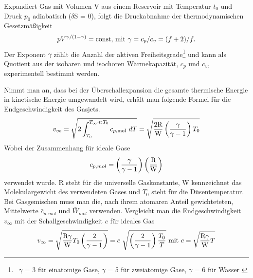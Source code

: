 %
Expandiert Gas mit Volumen V aus einem Reservoir mit Temperatur $t_0$ und Druck $p_0$ adiabatisch ($\delta$S = 0), folgt die Druckabnahme der thermodynamischen Gesetzmäßigkeit
\begin{equation}
pV^{\gamma/(1-\gamma)} = \textmd{const, mit}\ \gamma=c_p/c_v=(f+2)/f .
\end{equation}
%
Der Exponent $\gamma$ zählt die Anzahl der aktiven Freiheitsgrade\footnote[3]{\ $\gamma$ = 3 für einatomige Gase, $\gamma$ = 5 für zweiatomige Gase, $\gamma$ = 6 für Wasser \cite{mul13}} und kann als Quotient aus der isobaren und isochoren Wärmekapazität, $c_p$ und $c_v$, experimentell bestimmt werden. 

Nimmt man an, dass bei der Überschallexpansion die gesamte thermische Energie in kinetische Energie umgewandelt wird, erhält man folgende Formel für die Endgeschwindigkeit des Gasjets.
\begin{equation}
v_\infty=\sqrt{2\int_{T_0}^{T_\infty \ll T_0} c_{p,{\tiny \textmd{mol}}}\ dT}= \sqrt{\frac{2\textmd{R}}{\textmd{W}}\left(\frac{\gamma}{\gamma-1}\right)T_0}
\end{equation}
%
Wobei der Zusammenhang für ideale Gase
\begin{equation}
c_{p,mol}= \left(\frac{\gamma}{\gamma-1}\right)\left(\frac{\textmd{R}}{\textmd{W}}\right)
\end{equation}
%
verwendet wurde. R steht für die universelle Gaskonstante, W kennzeichnet das Molekulargewicht des verwendeten Gases und $T_0$ steht für die Düsentemperatur.
Bei Gasgemischen muss man die, nach ihrem atomaren Anteil gewichteteten, Mittelwerte $\bar{c}_{p,mol}$ und $\bar{W}_{mol}$ verwenden.
Vergleicht man die Endgeschwindigkeit $v_{\infty}$ mit der Schallgeschwindigkeit $c$ für ideales Gas
\begin{equation}
v_\infty= \sqrt{\frac{\textmd{R}\gamma}{\textmd{W}}T_0\left(\frac{2}{\gamma-1}\right)} = c\ \sqrt{\left(\frac{2}{\gamma-1}\right)\frac{T_0}{T}} \textmd{ mit } c=\sqrt{\frac{\textmd{R} \gamma}{\textmd{W}}T}
\end{equation}

